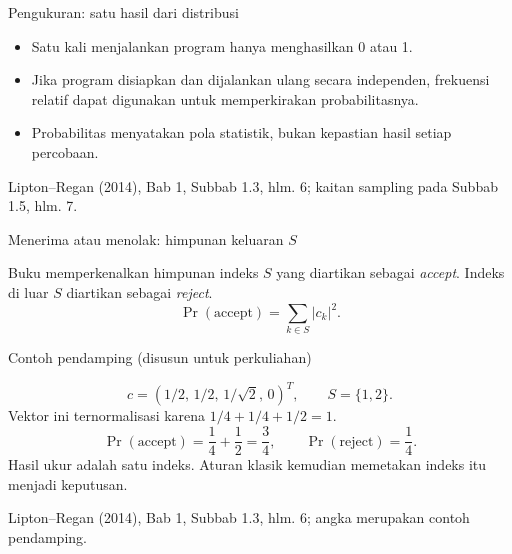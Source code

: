 \documentclass[aspectratio=169,11pt]{beamer}
\newcommand{\bookref}[1]{\par\vfill{\scriptsize\color{gray}Lipton--Regan (2014), Bab 1, #1.}}
\newcommand{\extra}{\par\textcolor{AcademicBlue}{\small Contoh pendamping (disusun untuk perkuliahan)}\par}
\begin{document}
\begin{frame}{Pengukuran: satu hasil dari distribusi}

\begin{center}
\end{center}
\begin{itemize}
\item Satu kali menjalankan program hanya menghasilkan 0 atau 1.
\item Jika program disiapkan dan dijalankan ulang secara independen, frekuensi relatif dapat digunakan untuk memperkirakan probabilitasnya.
\item Probabilitas menyatakan pola statistik, bukan kepastian hasil setiap percobaan.
\end{itemize}
\bookref{Subbab 1.3, hlm. 6; kaitan sampling pada Subbab 1.5, hlm. 7}

\end{frame}

\begin{frame}{Menerima atau menolak: himpunan keluaran $S$}

Buku memperkenalkan himpunan indeks $S$ yang diartikan sebagai \textit{accept}. Indeks di luar $S$ diartikan sebagai \textit{reject}.
\[
 \Pr(\text{accept})=\sum_{k\in S}|c_k|^2.
\]
\extra
\[
 c=(1/2,\,1/2,\,1/\sqrt2,\,0)^T,\qquad S=\{1,2\}.
\]
Vektor ini ternormalisasi karena $1/4+1/4+1/2=1$.
\[
 \Pr(\text{accept})=\frac14+\frac12=\frac34,
 \qquad \Pr(\text{reject})=\frac14.
\]
Hasil ukur adalah satu indeks. Aturan klasik kemudian memetakan indeks itu menjadi keputusan.
\bookref{Subbab 1.3, hlm. 6; angka merupakan contoh pendamping}

\end{frame}
\end{document}
